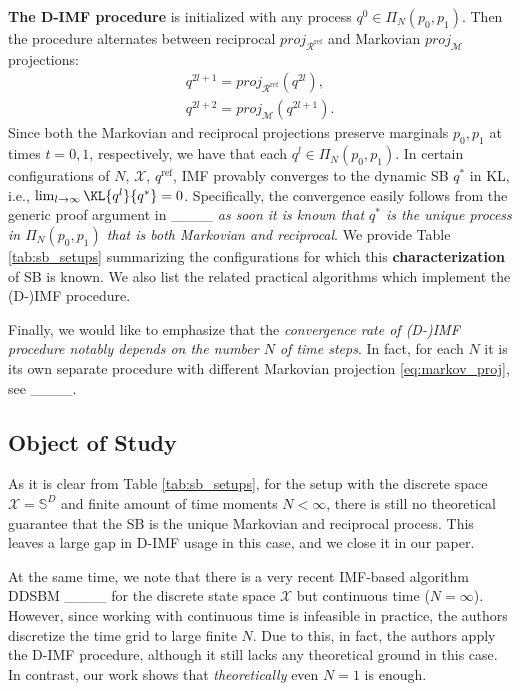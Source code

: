\textbf{The D-IMF procedure} is initialized with any process $q^0 \in \Pi_{N}(p_0, p_1)$. Then the procedure alternates between reciprocal $proj_{\mathcal{R}^{\text{ref}}}$ and Markovian $proj_{\mathcal{M}}$ projections:
\begin{equation}
    \label{eq:d_imf}
    \begin{gathered}
        q^{2l+1} = proj_{\mathcal{R}^{\text{ref}}}\left(q^{2l}\right),
        \\
        q^{2l+2} = proj_{\mathcal{M}}\left(q^{2l+1}\right).
    \end{gathered}
\end{equation}
Since both the Markovian and reciprocal projections preserve marginals $p_0,p_1$ at times $t=0,1$, respectively, we have that each $q^{l}\in\Pi_{N}(p_0,p_1)$. In certain configurations of $N$, $\mathcal{X}$, $q^{\text{ref}}$, IMF provably converges to the dynamic SB $q^{*}$ in KL, i.e., $\lim_{l\rightarrow\infty}\KL{q^{l}}{q^{*}}=0$. Specifically, the convergence easily follows from the generic proof argument in ____ \textit{as soon it is known that $q^{*}$ is the unique process in $\Pi_{N}(p_0,p_1)$ that is both Markovian and reciprocal}. We provide Table \ref{tab:sb_setups} summarizing the configurations for which this \textbf{characterization} of SB is known. We also list the related practical algorithms which implement the (D-)IMF procedure.

Finally, we would like to emphasize that the \textit{convergence rate of (D-)IMF procedure notably depends on the number $N$ of time steps}. In fact, for each $N$ it is its own separate procedure with different Markovian projection \eqref{eq:markov_proj}, see ____.

\subsection{Object of Study}
As it is clear from Table \ref{tab:sb_setups}, for the setup with the discrete space $\mathcal{X}=\mathbb{S}^{D}$ and finite amount of time moments $N<\infty$, there is still no theoretical guarantee that the SB is the unique Markovian and reciprocal process. This leaves a large gap in D-IMF usage in this case, and we close it in our paper. 

At the same time, we note that there is a very recent IMF-based algorithm DDSBM ____ for the discrete state space $\mathcal{X}$ but continuous time ($N=\infty$). However, since working with continuous time is infeasible in practice, the authors discretize the time grid to large finite $N$. Due to this, in fact, the authors apply the D-IMF procedure, although it still lacks any theoretical ground in this case. In contrast, our work shows that \textit{theoretically} even $N=1$ is enough.